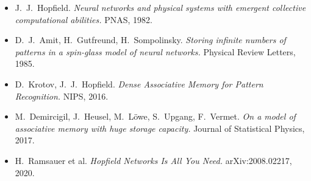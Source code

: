 \documentclass[11pt,a4paper]{article}
\begin{document}
\begin{itemize}
\item J.~J.~Hopfield. \emph{Neural networks and physical systems with
    emergent collective computational abilities.} PNAS, 1982.
\item D.~J.~Amit, H.~Gutfreund, H.~Sompolinsky. \emph{Storing infinite
    numbers of patterns in a spin-glass model of neural networks.}
    Physical Review Letters, 1985.
\item D.~Krotov, J.~J.~Hopfield. \emph{Dense Associative Memory for
    Pattern Recognition.} NIPS, 2016.
\item M.~Demircigil, J.~Heusel, M.~L\"owe, S.~Upgang, F.~Vermet.
    \emph{On a model of associative memory with huge storage capacity.}
    Journal of Statistical Physics, 2017.
\item H.~Ramsauer et al. \emph{Hopfield Networks Is All You Need.}
    arXiv:2008.02217, 2020.
\end{itemize}
\end{document}
